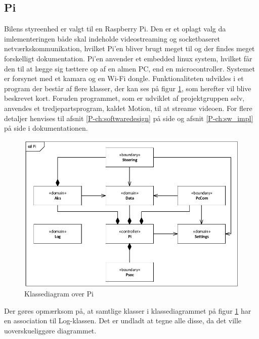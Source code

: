 \subsection{Pi}

Bilens styreenhed er valgt til en Raspberry Pi. Den er et oplagt valg da imlementeringen både skal indeholde videostreaming og socketbaseret netværkskommunikation, hvilket Pi'en bliver brugt meget til og der findes meget forskelligt dokumentation. 
Pi'en anvender et embedded linux system, hvilket får den til at lægge sig tættere op af en almen PC, end en microcontroller. 
Systemet er forsynet med et kamara\cite{lib:cam} og en Wi-Fi dongle\cite{lib:wifi}. 
Funktionaliteten udvikles i et program der består af flere klasser, der kan ses på figur \ref{fig:cd_pi}, som herefter vil blive beskrevet kort. 
Foruden programmet, som er udviklet af projektgruppen selv, anvendes et tredjepartsprogram, kaldet Motion\cite{lib:motion-on-raspberry}, til at streame videoen. For flere detaljer henvises til afsnit \ref{P-ch:softwaredesign}  på side \pageref{P-ch:softwaredesign} og afsnit \ref{P-ch:sw_impl}  på side \pageref{P-ch:sw_impl} i dokumentationen.

\begin{figure}[h]
\centering
\includegraphics[width=0.7\textwidth* 9/10]{../fig/diagrammer/bil/cd_pi.pdf}
\caption{Klassediagram over Pi}
\label{fig:cd_pi}
\end{figure}

Der gøres opmærksom på, at samtlige klasser i klassediagrammet på figur \ref{fig:cd_pi} har en association til Log-klassen. Det er undladt at tegne alle disse, da det ville uoverskueliggøre diagrammet.










